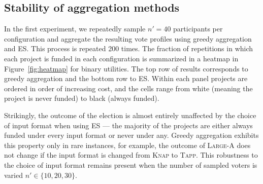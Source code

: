 \documentclass[twoside,11pt]{article}
\newcommand{\kibitz}[2]{\ifnum\Comments=1{\color{#1}{#2}}\fi}
\newcommand{\gb}[1]{\kibitz{red}{[GB:#1]}}
\newcommand{\knap}{\textsc{Knap}}
\newcommand{\tapp}{\textsc{Tapp}}
\newcommand{\mes}{ES}
\begin{document}
\subsection{Stability of aggregation methods}  
\label{sec:aggregation}


 




In the first experiment, we repeatedly sample $n'=40$ participants per configuration  and aggregate the resulting vote profiles using greedy aggregation and \mes{}. This process is repeated 200 times.%
%
The fraction of repetitions in which each project is funded in each configuration is summarized   in a heatmap in Figure~\ref{fig:heatmap} for binary utilities. The top row of results corresponds to greedy aggregation and the bottom row to \mes. Within each panel projects are ordered in order of increasing cost, and the cells range from white (meaning the project is never funded) to black (always funded). \gb{TODO:need a similar heatmap for 0-cost utilities. include that in discussion here or push to appendix with comment about similar results. }

\begin{figure*}[h]
\begin{center}
\caption{Stability heatmaps for  greedy aggregation (top) and \mes{} (bottom) with binary utilities in each election. 
Within each panel each row represents an   input format and each column a project (ordered in increasing cost).
 The intensity of a cell indicates the fraction of instances in which the project was funded. \gb{fix greedy/es}
}\label{fig:heatmap}
\end{center}\vspace{-3mm}
\end{figure*}

Strikingly, the outcome of the election is almost entirely unaffected by the choice of input format when using \mes{} --- the majority of the projects are either always funded under every input format or never under any. Greedy aggregation exhibits this property only in rare instances, for example, the outcome of \textsc{Large-A} does not change if the input format is changed from \knap{} to \tapp.  This robustness to the choice of input format remains present when the number of sampled voters is varied $n'\in\{10,20,30\}.$
\end{document}
